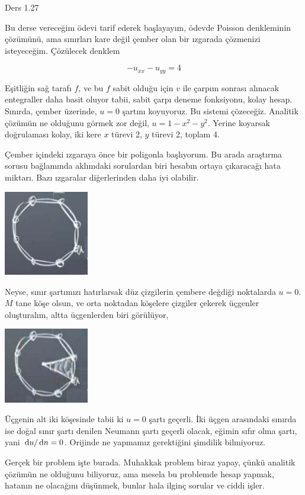 \documentclass[12pt,fleqn]{article}\usepackage{../../common}
\begin{document}
Ders 1.27

Bu derse vereceğim ödevi tarif ederek başlayayım, ödevde Poisson denkleminin
çözümünü, ama sınırları kare değil çember olan bir ızgarada çözmenizi
isteyeceğim. Çözülecek denklem

$$
-u_{xx} - u_{yy} = 4
$$

Eşitliğin sağ tarafı $f$, ve bu $f$ sabit olduğu için $v$ ile çarpım sonrası
alınacak entegraller daha basit oluyor tabii, sabit çarpı deneme fonksiyonu,
kolay hesap.  Sınırda, çember üzerinde, $u = 0$ şartını koyuyoruz. Bu sistemi
çözeceğiz. Analitik çözümün ne olduğunu görmek zor değil, $u = 1 - x^2 - y^2$.
Yerine koyarsak doğrulaması kolay, iki kere $x$ türevi 2, $y$ türevi 2, toplam
4.

Çember içindeki ızgaraya önce bir poligonla başlıyorum. Bu arada araştırma
sorusu bağlamında aklımdaki sorulardan biri hesabın ortaya çıkaracağı hata
miktarı. Bazı ızgaralar diğerlerinden daha iyi olabilir.

\includegraphics[width=10em]{compscieng_1_27_01.png}

Neyse, sınır şartımızı hatırlarsak düz çizgilerin çembere değdiği noktalarda
$u = 0$. $M$ tane köşe olsun, ve orta noktadan köşelere çizgiler çekerek
üçgenler oluşturalım, altta üçgenlerden biri görülüyor,

\includegraphics[width=10em]{compscieng_1_27_02.png}

Üçgenin alt iki köşesinde tabii ki $u = 0$ şartı geçerli. İki üçgen arasındaki
sınırda ise doğal sınır şartı denilen Neumann şartı geçerli olacak, eğimin
sıfır olma şartı, yani $\,\mathrm{d} u / \,\mathrm{d} n = 0$. Orijinde ne yapmamız gerektiğini
şimdilik bilmiyoruz.

Gerçek bir problem işte burada. Muhakkak problem biraz yapay, çünkü analitik
çözümün ne olduğunu biliyoruz, ama mesela bu problemde hesap yapmak, hatanın
ne olacağını düşünmek, bunlar hala ilginç sorular ve ciddi işler. 
\end{document}
